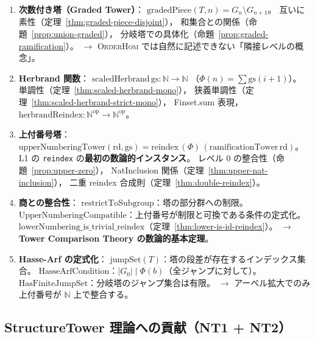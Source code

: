 \documentclass[a4paper,11pt]{ltjsarticle}
\theoremstyle{definition}
\theoremstyle{plain}
\theoremstyle{remark}
\newcommand{\Phi}{\varPhi}
\begin{document}
\begin{enumerate}[label=\S NT2-\arabic*.]
  \item \textbf{次数付き塔（Graded Tower）}：
    $\mathrm{gradedPiece}(T,n) = G_n \setminus G_{n+1}$。
    互いに素性（定理~\ref{thm:graded-piece-disjoint}），
    和集合との関係（命題~\ref{prop:union-graded}），
    分岐塔での具体化（命題~\ref{prop:graded-ramification}）。
    $\to$ \textsc{OrderHom} では自然に記述できない「隣接レベルの概念」。

  \item \textbf{Herbrand 関数}：
    $\mathrm{scaledHerbrand}\,\mathrm{gs}\colon \mathbb{N} \to \mathbb{N}$
    （$\Phi(n) = \sum \mathrm{gs}(i+1)$）。
    単調性（定理~\ref{thm:scaled-herbrand-mono}），
    狭義単調性（定理~\ref{thm:scaled-herbrand-strict-mono}），
    Finset.sum 表現，
    $\mathrm{herbrandReindex}\colon \mathbb{N}^{\mathrm{op}} \to \mathbb{N}^{\mathrm{op}}$。

  \item \textbf{上付番号塔}：
    $\mathrm{upperNumberingTower}(\mathrm{rd},\mathrm{gs})
    = \mathrm{reindex}\,(\Phi)\,(\mathrm{ramificationTower}\,\mathrm{rd})$。
    L1 の \texttt{reindex} の\textbf{最初の数論的インスタンス}。
    レベル 0 の整合性（命題~\ref{prop:upper-zero}），
    NatInclusion 関係（定理~\ref{thm:upper-nat-inclusion}），
    二重 reindex 合成則（定理~\ref{thm:double-reindex}）。

  \item \textbf{商との整合性}：
    $\mathrm{restrictToSubgroup}$：塔の部分群への制限。
    $\mathrm{UpperNumberingCompatible}$：上付番号が制限と可換である条件の定式化。
    $\mathrm{lowerNumbering\_is\_trivial\_reindex}$（定理~\ref{thm:lower-is-id-reindex}）。
    $\to$ \textbf{Tower Comparison Theory の数論的基本定理}。

  \item \textbf{Hasse-Arf の定式化}：
    $\mathrm{jumpSet}(T)$：塔の段差が存在するインデックス集合。
    $\mathrm{HasseArfCondition}$：$|G_0| \mid \Phi(b)$（全ジャンプに対して）。
    $\mathrm{HasFiniteJumpSet}$：分岐塔のジャンプ集合は有限。
    $\to$ アーベル拡大でのみ上付番号が $\mathbb{N}$ 上で整合する。
\end{enumerate}

\subsection{StructureTower 理論への貢献（NT1 + NT2）}
\end{document}
